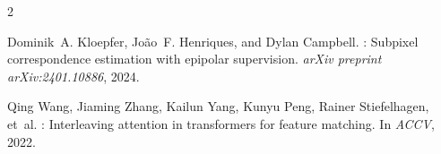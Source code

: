 \documentclass[11pt,a4paper]{article}
\begin{document}

\begin{thebibliography}{2}

Dominik~A. Kloepfer, Jo\~{a}o~F. Henriques, and Dylan Campbell.
: Subpixel correspondence estimation with epipolar supervision.
\newblock \emph{arXiv preprint arXiv:2401.10886}, 2024.

Qing Wang, Jiaming Zhang, Kailun Yang, Kunyu Peng, Rainer Stiefelhagen, et~al.
: Interleaving attention in transformers for feature matching.
\newblock In \emph{ACCV}, 2022.

\end{thebibliography}
\end{document}
